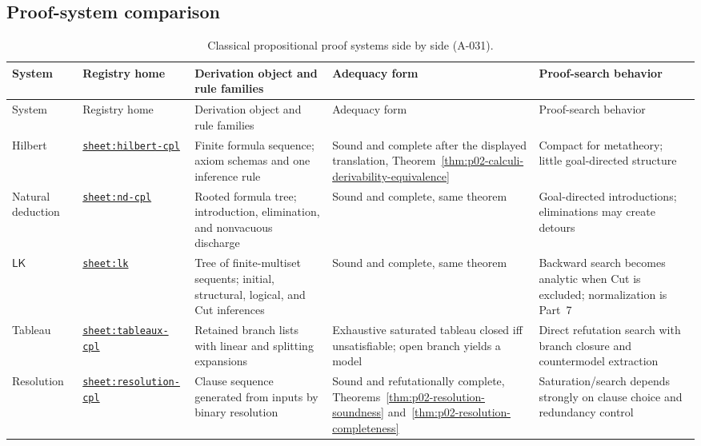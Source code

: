 \begin{landscape}
\subsection{Proof-system comparison}
\label{sec:p02-proof-system-comparison}

\begingroup\scriptsize\setlength{\tabcolsep}{3pt}
\begin{longtable}{@{}p{.72in}p{1.20in}p{1.80in}p{1.45in}p{1.70in}@{}}
\caption{Classical propositional proof systems side by side (A-031).}
\label{tab:p02-proof-systems}\\
\toprule
System & Registry home & Derivation object and rule families & Adequacy form & Proof-search behavior \\ \midrule
\endfirsthead
\toprule
System & Registry home & Derivation object and rule families & Adequacy form & Proof-search behavior \\ \midrule
\endhead
Hilbert & \hyperref[sheet:hilbert-cpl]{\texttt{sheet:hilbert-cpl}} & Finite formula sequence; axiom schemas and one inference rule & Sound and complete after the displayed translation, Theorem~\ref{thm:p02-calculi-derivability-equivalence} & Compact for metatheory; little goal-directed structure \\
Natural deduction & \hyperref[sheet:nd-cpl]{\texttt{sheet:nd-cpl}} & Rooted formula tree; introduction, elimination, and nonvacuous discharge & Sound and complete, same theorem & Goal-directed introductions; eliminations may create detours \\
\(\mathsf{LK}\) & \hyperref[sheet:lk]{\texttt{sheet:lk}} & Tree of finite-multiset sequents; initial, structural, logical, and Cut inferences & Sound and complete, same theorem & Backward search becomes analytic when Cut is excluded; normalization is Part~7 \\
Tableau & \hyperref[sheet:tableaux-cpl]{\texttt{sheet:tableaux-cpl}} & Retained branch lists with linear and splitting expansions & Exhaustive saturated tableau closed iff unsatisfiable; open branch yields a model & Direct refutation search with branch closure and countermodel extraction \\
Resolution & \hyperref[sheet:resolution-cpl]{\texttt{sheet:resolution-cpl}} & Clause sequence generated from inputs by binary resolution & Sound and refutationally complete, Theorems~\ref{thm:p02-resolution-soundness} and~\ref{thm:p02-resolution-completeness} & Saturation/search depends strongly on clause choice and redundancy control \\
\bottomrule
\end{longtable}
\endgroup
\end{landscape}
